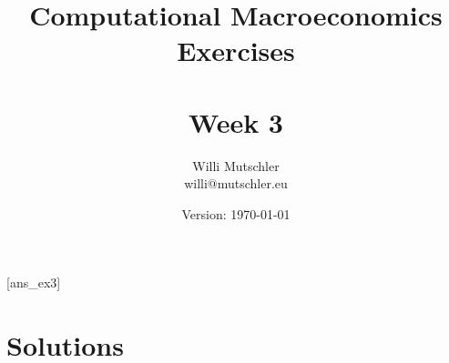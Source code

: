 
\newif\ifDisplaySolutions \DisplaySolutionstrue


\title{Computational Macroeconomics\\Exercises\\~\\Week 3}
\author{Willi Mutschler\\willi@mutschler.eu}
\date{Version: \today}
\maketitle\thispagestyle{empty}

\newpage
{}[ans_ex3]
\tableofcontents\thispagestyle{empty}\newpage

\setcounter{page}{1}
\newpage
\newpage
\newpage

\printbibliography
{}
\ifDisplaySolutions
\newpage
\appendix
\section{Solutions}

\fi
